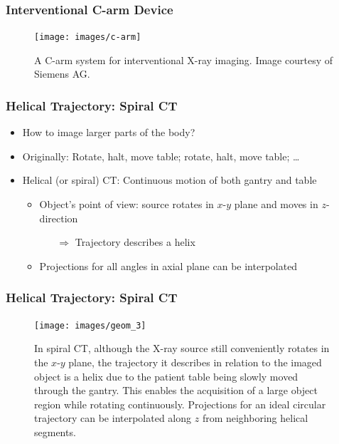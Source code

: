\begin{frame}
	\frametitle{Interventional C-arm Device}

	\begin{figure}[tbp]
		\centering
		\texttt{[image: images/c-arm]}
		\caption{A C-arm system for interventional X-ray imaging. Image courtesy of Siemens AG.}
		\label{fig:ct_geom_2}
	\end{figure}

\end{frame}

\begin{frame}
	\frametitle{Helical Trajectory: Spiral CT}

	\begin{itemize}
		\setlength\itemsep{0.3cm}
		\item How to image larger parts of the body?
		\item Originally: Rotate, halt, move table; rotate, halt, move table; \ldots
		\item Helical (or spiral) CT: Continuous motion of both gantry and table

		      \hspace{0.1cm}
		      \begin{itemize}
			      \setlength\itemsep{0.2cm}
			      \item Object's point of view: source rotates in $x$-$y$ plane and moves in $z$-direction
			            \begin{itemize}
				            \item[$\Rightarrow$] Trajectory describes a helix
			            \end{itemize}
			      \item Projections for all angles in axial plane can be interpolated

		      \end{itemize}

	\end{itemize}

\end{frame}

\begin{frame}
	\frametitle{Helical Trajectory: Spiral CT}

	\begin{figure}[tbp]
		\centering
		\texttt{[image: images/geom\_3]}
		\caption{In spiral CT, although the X-ray source still conveniently rotates in the $x$-$y$ plane, the trajectory it describes in relation to the imaged object is a helix due to the patient table being slowly moved through the gantry. This enables the acquisition of a large object region while rotating continuously. Projections for an ideal circular trajectory can be interpolated along $z$ from neighboring helical segments.}
		\label{fig:ct_geom_1.3}
	\end{figure}

\end{frame}

